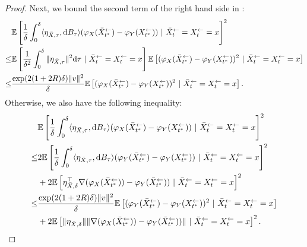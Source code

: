 \begin{proof}
Next, we bound the second term of the right hand side in : 
\begin{align}
& \mathbb{E}\left[ \frac{1}{\delta} \int_{0}^\delta \langle \eta_{\bar{X},\tau} , \mathrm{d} B_\tau \rangle  (\varphi_X( \bar{X}_{t^*}^\leftarrow) - \varphi_Y( {X}_{t^*}^\leftarrow))  ~|~ \bar{X}_{t}^\leftarrow = {X}_{t}^\leftarrow = x\right]^2 \\
\leq &
\mathbb{E}\left[ \frac{1}{\delta^2} \int_{0}^\delta \|\eta_{\bar{X},\tau}\|^2 {\textnormal{d}} \tau  ~|~ \bar{X}_{t}^\leftarrow = {X}_{t}^\leftarrow = x\right] 
\mathbb{E}\left[ (\varphi_X( \bar{X}_{t^*}^\leftarrow) - \varphi_Y( {X}_{t^*}^\leftarrow))^2  ~|~ \bar{X}_{t}^\leftarrow = {X}_{t}^\leftarrow = x\right] \\
\leq &
\frac{\exp(2(1 + 2R)\delta)\|v\|^2}{\delta}
\mathbb{E}\left[ (\varphi_X( \bar{X}_{t^*}^\leftarrow) - \varphi_Y( {X}_{t^*}^\leftarrow))^2  ~|~ \bar{X}_{t}^\leftarrow = {X}_{t}^\leftarrow = x\right]. 
\label{eq:varPhiXYdiff}
\end{align}
Otherwise, we also have the following inequality:  
\begin{align}
& \mathbb{E}\left[ \frac{1}{\delta} \int_{0}^\delta \langle \eta_{\bar{X},\tau} , \mathrm{d} B_\tau \rangle  (\varphi_X( \bar{X}_{t^*}^\leftarrow) - \varphi_Y( {X}_{t^*}^\leftarrow))  ~|~ \bar{X}_{t}^\leftarrow = {X}_{t}^\leftarrow = x\right]^2 \\
\leq & 2 \mathbb{E}\left[ \frac{1}{\delta} \int_{0}^\delta \langle \eta_{\bar{X},\tau} , \mathrm{d} B_\tau \rangle  (\varphi_Y( \bar{X}_{t^*}^\leftarrow) -\varphi_Y( {X}_{t^*}^\leftarrow)  )  ~|~ \bar{X}_{t}^\leftarrow = {X}_{t}^\leftarrow = x\right]^2 \\ & 
+ 2 \mathbb{E}\left[  \eta_{\bar{X},\delta}^\top \nabla (\varphi_X( \bar{X}_{t^*}^\leftarrow)) - \varphi_Y( \bar{X}_{t^*}^\leftarrow))  ~|~ \bar{X}_{t}^\leftarrow = {X}_{t}^\leftarrow = x\right]^2 \\
\leq &
\frac{\exp(2(1 + 2R)\delta)\|v\|^2}{\delta}
\mathbb{E}\left[ (\varphi_Y( \bar{X}_{t^*}^\leftarrow) - \varphi_Y( {X}_{t^*}^\leftarrow))^2  ~|~ \bar{X}_{t}^\leftarrow = {X}_{t}^\leftarrow = x\right] \\
& + 2 \mathbb{E}\left[ \| \eta_{\bar{X},\delta} \| \|\nabla (\varphi_X( \bar{X}_{t^*}^\leftarrow)) - \varphi_Y( \bar{X}_{t^*}^\leftarrow))\|  ~|~ \bar{X}_{t}^\leftarrow = {X}_{t}^\leftarrow = x\right]^2.
\label{eq:varPhiXYdiffSecond}
\end{align}


\end{proof}
